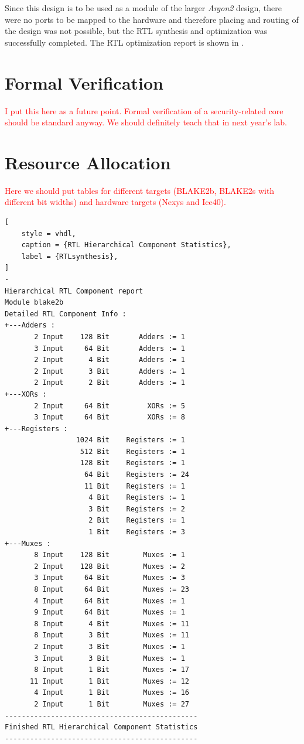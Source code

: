\documentclass[%
	a4paper,
]
{article}
\newcommand{\todo}[1]{\textcolor{red}{#1}}
\begin{document}
Since this design is to be used as a module of the larger \emph{Argon2}
design, there were no ports to be mapped to the hardware and therefore placing
and routing of the design was not possible, but the RTL synthesis and
optimization was successfully completed. The RTL optimization report is shown
in  .
%
%
\section{Formal Verification}
\label{sec:formal-verification}

\todo{I put this here as a future point. Formal verification of a
security-related core should be standard anyway. We should definitely teach
that in next year's lab.}
%
%
\section{Resource Allocation}
\label{sec:resource-allocation}

\todo{Here we should put tables for different targets (BLAKE2b, BLAKE2s with
different bit widths) and hardware targets (Nexys and Ice40).}

\begin{lstlisting}[
	style = vhdl,
	caption = {RTL Hierarchical Component Statistics},
	label = {RTLsynthesis},
]
-
Hierarchical RTL Component report 
Module blake2b 
Detailed RTL Component Info : 
+---Adders : 
	   2 Input    128 Bit       Adders := 1     
	   3 Input     64 Bit       Adders := 1     
	   2 Input      4 Bit       Adders := 1     
	   2 Input      3 Bit       Adders := 1     
	   2 Input      2 Bit       Adders := 1     
+---XORs : 
	   2 Input     64 Bit         XORs := 5     
	   3 Input     64 Bit         XORs := 8     
+---Registers : 
	             1024 Bit    Registers := 1     
	              512 Bit    Registers := 1     
	              128 Bit    Registers := 1     
	               64 Bit    Registers := 24    
	               11 Bit    Registers := 1    
	                4 Bit    Registers := 1     
	                3 Bit    Registers := 2     
	                2 Bit    Registers := 1     
	                1 Bit    Registers := 3     
+---Muxes : 
	   8 Input    128 Bit        Muxes := 1     
	   2 Input    128 Bit        Muxes := 2     
	   3 Input     64 Bit        Muxes := 3     
	   8 Input     64 Bit        Muxes := 23    
	   4 Input     64 Bit        Muxes := 1     
	   9 Input     64 Bit        Muxes := 1     
	   8 Input      4 Bit        Muxes := 11    
	   8 Input      3 Bit        Muxes := 11    
	   2 Input      3 Bit        Muxes := 1     
	   3 Input      3 Bit        Muxes := 1     
	   8 Input      1 Bit        Muxes := 17    
	  11 Input      1 Bit        Muxes := 12    
	   4 Input      1 Bit        Muxes := 16    
	   2 Input      1 Bit        Muxes := 27    
----------------------------------------------
Finished RTL Hierarchical Component Statistics
----------------------------------------------

\end{lstlisting}
%
%
\end{document}
